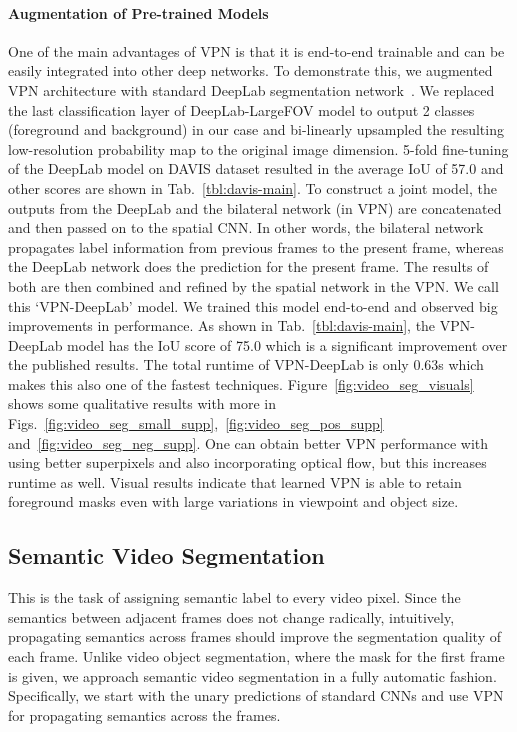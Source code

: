 \documentclass[10pt,twocolumn,letterpaper]{article}
\begin{document}
\paragraph{Augmentation of Pre-trained Models} One of the main advantages of VPN
is that it is end-to-end trainable and can be easily integrated into
other deep networks. To demonstrate this, we augmented VPN architecture
with standard DeepLab segmentation network~\cite{chen2014semantic}.
We replaced the last classification layer of DeepLab-LargeFOV model
to output 2 classes (foreground and background)
in our case and bi-linearly upsampled the resulting low-resolution probability map to
the original image dimension. 5-fold fine-tuning of the DeepLab model on DAVIS dataset
resulted in the average IoU of 57.0 and other scores are shown in Tab.~\ref{tbl:davis-main}.
To construct a joint model, the outputs from
the DeepLab and the bilateral network (in VPN) are concatenated and then passed on to the spatial CNN.
In other words, the bilateral network propagates label information from previous frames to the present
frame, whereas the DeepLab network does the prediction for the present frame. The results
of both are then combined and refined by the spatial network in the VPN.
We call this `VPN-DeepLab' model. We trained this model end-to-end and observed big
improvements in performance. As shown in Tab.~\ref{tbl:davis-main}, the VPN-DeepLab
model has the IoU score of 75.0 which is a significant improvement over the published results.
The total runtime of VPN-DeepLab is only 0.63s which makes this also one of
the fastest techniques. Figure~\ref{fig:video_seg_visuals} shows
some qualitative results with more in Figs.~\ref{fig:video_seg_small_supp},~\ref{fig:video_seg_pos_supp}
and~\ref{fig:video_seg_neg_supp}.
One can obtain better VPN performance with using better superpixels and
also incorporating optical flow, but this increases runtime as well.
Visual results indicate that learned VPN is able to retain foreground masks even
with large variations in viewpoint and object size.

\subsection{Semantic Video Segmentation}

This is the task of assigning semantic label to every video pixel.
Since the semantics between adjacent frames does not change
radically, intuitively, propagating semantics across frames should improve
the segmentation quality of each frame. Unlike video object segmentation,
where the mask for the first frame is given, we approach semantic video segmentation
in a fully automatic fashion. Specifically, we start
with the unary predictions of standard CNNs and use VPN for propagating semantics across the frames.
\end{document}
